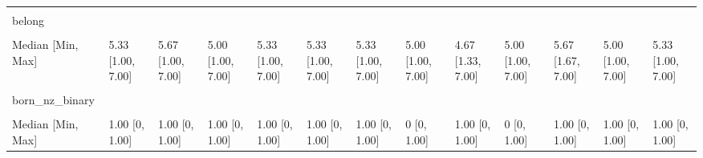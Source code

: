 \documentclass[
  single column]{article}
\begin{document}
\begin{landscape}
\begin{longtable}[t]{lllllllllllll}
\cellcolor{gray!10}{Missing} & \cellcolor{gray!10}{2766 (12.8\%)} & \cellcolor{gray!10}{168 (12.3\%)} & \cellcolor{gray!10}{57 (21.1\%)} & \cellcolor{gray!10}{279 (13.8\%)} & \cellcolor{gray!10}{647 (17.5\%)} & \cellcolor{gray!10}{235 (21.5\%)} & \cellcolor{gray!10}{26 (19.1\%)} & \cellcolor{gray!10}{17 (19.5\%)} & \cellcolor{gray!10}{345 (52.4\%)} & \cellcolor{gray!10}{75 (13.0\%)} & \cellcolor{gray!10}{159 (21.4\%)} & \cellcolor{gray!10}{4774 (14.8\%)}\\
belong &  &  &  &  &  &  &  &  &  &  &  & \\
\cellcolor{gray!10}{Mean (SD)} & \cellcolor{gray!10}{5.11 (1.14)} & \cellcolor{gray!10}{5.37 (1.05)} & \cellcolor{gray!10}{4.99 (1.24)} & \cellcolor{gray!10}{5.26 (1.11)} & \cellcolor{gray!10}{5.19 (1.13)} & \cellcolor{gray!10}{5.23 (1.15)} & \cellcolor{gray!10}{4.99 (1.21)} & \cellcolor{gray!10}{4.65 (1.16)} & \cellcolor{gray!10}{4.83 (1.21)} & \cellcolor{gray!10}{5.38 (1.03)} & \cellcolor{gray!10}{4.84 (1.30)} & \cellcolor{gray!10}{5.13 (1.14)}\\
Median [Min, Max] & 5.33 [1.00, 7.00] & 5.67 [1.00, 7.00] & 5.00 [1.00, 7.00] & 5.33 [1.00, 7.00] & 5.33 [1.00, 7.00] & 5.33 [1.00, 7.00] & 5.00 [1.00, 7.00] & 4.67 [1.33, 7.00] & 5.00 [1.00, 7.00] & 5.67 [1.67, 7.00] & 5.00 [1.00, 7.00] & 5.33 [1.00, 7.00]\\
\addlinespace
\cellcolor{gray!10}{Missing} & \cellcolor{gray!10}{103 (0.5\%)} & \cellcolor{gray!10}{11 (0.8\%)} & \cellcolor{gray!10}{2 (0.7\%)} & \cellcolor{gray!10}{11 (0.5\%)} & \cellcolor{gray!10}{23 (0.6\%)} & \cellcolor{gray!10}{3 (0.3\%)} & \cellcolor{gray!10}{0 (0\%)} & \cellcolor{gray!10}{2 (2.3\%)} & \cellcolor{gray!10}{3 (0.5\%)} & \cellcolor{gray!10}{1 (0.2\%)} & \cellcolor{gray!10}{7 (0.9\%)} & \cellcolor{gray!10}{166 (0.5\%)}\\
born\_nz\_binary &  &  &  &  &  &  &  &  &  &  &  & \\
\cellcolor{gray!10}{Mean (SD)} & \cellcolor{gray!10}{0.794 (0.405)} & \cellcolor{gray!10}{0.831 (0.375)} & \cellcolor{gray!10}{0.587 (0.493)} & \cellcolor{gray!10}{0.786 (0.410)} & \cellcolor{gray!10}{0.776 (0.417)} & \cellcolor{gray!10}{0.747 (0.435)} & \cellcolor{gray!10}{0.441 (0.498)} & \cellcolor{gray!10}{0.667 (0.474)} & \cellcolor{gray!10}{0.230 (0.421)} & \cellcolor{gray!10}{0.890 (0.313)} & \cellcolor{gray!10}{0.779 (0.415)} & \cellcolor{gray!10}{0.778 (0.416)}\\
Median [Min, Max] & 1.00 [0, 1.00] & 1.00 [0, 1.00] & 1.00 [0, 1.00] & 1.00 [0, 1.00] & 1.00 [0, 1.00] & 1.00 [0, 1.00] & 0 [0, 1.00] & 1.00 [0, 1.00] & 0 [0, 1.00] & 1.00 [0, 1.00] & 1.00 [0, 1.00] & 1.00 [0, 1.00]\\

\end{longtable}
\end{landscape}
\end{document}
